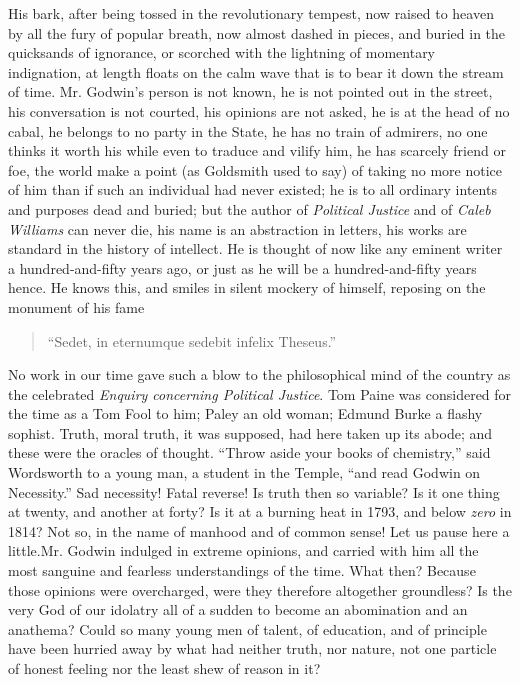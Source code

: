 His bark, after being tossed in the revolutionary tempest, now
raised to heaven by all the fury of popular breath, now almost
dashed in pieces, and buried in the quicksands of ignorance, or
scorched with the lightning of momentary indignation, at length
floats on the calm wave that is to bear it down the stream of
time. Mr. Godwin's person is not known, he is not pointed out in
the street, his conversation is not courted, his opinions are not
asked, he is at the head of no cabal, he belongs to no party in
the State, he has no train of admirers, no one thinks it worth his
while even to traduce and vilify him, he has scarcely friend or
foe, the world make a point (as Goldsmith used to say) of taking
no more notice of him than if such an individual had never
existed; he is to all ordinary intents and purposes dead and
buried; but the author of \emph{Political Justice} and of
\emph{Caleb Williams} can never die, his name is an abstraction in
letters, his works are standard in the history of intellect. He is
thought of now like any eminent writer a hundred-and-fifty years
ago, or just as he will be a hundred-and-fifty years hence. He
knows this, and smiles in silent mockery of himself, reposing on
the monument of his fame\textemdash
\begin{quote}
  ``Sedet, in eternumque sedebit infelix Theseus.''
\end{quote}
No work in our time gave such a blow to the
philosophical mind of the country as the celebrated \emph{Enquiry
concerning Political Justice}. Tom Paine was considered for the
time as a Tom Fool to him; Paley an old woman; Edmund Burke a
flashy sophist. Truth, moral truth, it was supposed, had here
taken up its abode; and these were the oracles of thought. ``Throw
aside your books of chemistry,'' said Wordsworth to a young man, a
student in the Temple, ``and read Godwin on Necessity.'' Sad
necessity! Fatal reverse! Is truth then so variable? Is it one
thing at twenty, and another at forty? Is it at a burning heat in
1793, and below \emph{zero} in 1814? Not so, in the name of
manhood and of common sense! Let us pause here a
little.\textemdash Mr. Godwin indulged in extreme opinions, and
carried with him all the most sanguine and fearless understandings
of the time. What then? Because those opinions were overcharged,
were they therefore altogether groundless? Is the very God of our
idolatry all of a sudden to become an abomination and an anathema?
Could so many young men of talent, of education, and of principle
have been hurried away by what had neither truth, nor nature, not
one particle of honest feeling nor the least shew of reason in it?
